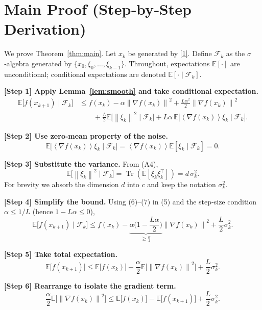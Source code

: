 \documentclass[11pt]{article}
\newcommand{\E}{\mathbb{E}}
\newcommand{\norm}[1]{\left\|#1\right\|}
\newcommand{\inner}[1]{\left\langle#1\right\rangle}
\begin{document}
\section*{Main Proof (Step‑by‑Step Derivation)}
We prove Theorem~\ref{thm:main}.  Let $x_{k}$ be generated by \eqref{1}.  Define $\mathcal F_{k}$ as the $\sigma$‑algebra generated by $\{x_{0},\xi_{0},\dots,\xi_{k-1}\}$.  Throughout, expectations $\E[\cdot]$ are unconditional; conditional expectations are denoted $\E[\cdot\mid\mathcal F_{k}]$.

\bigskip
\noindent\textbf{[Step 1] Apply Lemma~\ref{lem:smooth} and take conditional expectation.}
\[
\begin{aligned}
\E\!\big[f(x_{k+1})\mid\mathcal F_{k}\big]
&\le f(x_{k})-\alpha\norm{\nabla f(x_{k})}^{2}
   +\frac{L\alpha^{2}}{2}\norm{\nabla f(x_{k})}^{2}                \\
&\qquad +\frac{L}{2}\E\!\big[\norm{\xi_{k}}^{2}\mid\mathcal F_{k}\big]
   +L\alpha\,\E\!\big[\inner{\nabla f(x_{k})}{\xi_{k}}\mid\mathcal F_{k}\big].
\end{aligned}
\tag{5}
\]

\noindent\textbf{[Step 2] Use zero‑mean property of the noise.}
\[
\E\!\big[\inner{\nabla f(x_{k})}{\xi_{k}}\mid\mathcal F_{k}\big]=
\inner{\nabla f(x_{k})}{\E[\xi_{k}\mid\mathcal F_{k}] }=0.
\tag{6}
\]

\noindent\textbf{[Step 3] Substitute the variance.}
From (A4),
\[
\E\!\big[\norm{\xi_{k}}^{2}\mid\mathcal F_{k}\big]=\operatorname{Tr}(\E[\xi_{k}\xi_{k}^{\top}])=d\,\sigma_{k}^{2}.
\tag{7}
\]
For brevity we absorb the dimension $d$ into $c$ and keep the notation $\sigma_{k}^{2}$.

\noindent\textbf{[Step 4] Simplify the bound.}
Using (6)–(7) in (5) and the step‑size condition $\alpha\le1/L$ (hence $1-L\alpha\le0$),
\[
\E\!\big[f(x_{k+1})\mid\mathcal F_{k}\big]
\le f(x_{k})-\underbrace{\alpha\Big(1-\frac{L\alpha}{2}\Big)}_{\displaystyle \ge \frac{\alpha}{2}}
   \norm{\nabla f(x_{k})}^{2}
   +\frac{L}{2}\sigma_{k}^{2}.
\tag{8}
\]

\noindent\textbf{[Step 5] Take total expectation.}
\[
\E\!\big[f(x_{k+1})\big]\le \E\!\big[f(x_{k})\big]
   -\frac{\alpha}{2}\E\!\big[\norm{\nabla f(x_{k})}^{2}\big]
   +\frac{L}{2}\sigma_{k}^{2}.
\tag{9}
\]

\noindent\textbf{[Step 6] Rearrange to isolate the gradient term.}
\[
\frac{\alpha}{2}\E\!\big[\norm{\nabla f(x_{k})}^{2}\big]
\le \E\!\big[f(x_{k})\big]-\E\!\big[f(x_{k+1})\big]
   +\frac{L}{2}\sigma_{k}^{2}.
\tag{10}
\]
\end{document}
